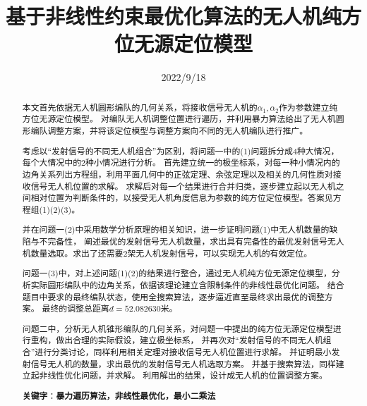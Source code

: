\documentclass{ctexart}
\title{基于非线性约束最优化算法的无人机纯方位无源定位模型}
\date{2022/9/18}
\def\al{\alpha}
\begin{document}
	\maketitle
	\renewcommand{\abstractname}{\Large 摘要\\}
	\begin{abstract}
		\normalsize
		本文首先依据无人机圆形编队的几何关系，将接收信号无人机的$\al_1,\al_2$作为参数建立纯方位无源定位模型。
		对编队无人机调整位置进行遍历，并利用暴力算法给出了无人机圆形编队调整方案，并将该定位模型与调整方案向不同的无人机编队进行推广。

		考虑以“发射信号的不同无人机组合”为区别，将问题一中的(1)问题拆分成4种大情况，每个大情况中的2种小情况进行分析。
		首先建立统一的极坐标系，对每一种小情况内的边角关系列出方程组，利用平面几何中的正弦定理、余弦定理以及相关的几何性质对接收信号无人机位置的求解。
		求解后对每一个结果进行合并归类，逐步建立起以无人机之间相对位置为判断条件的，以接受无人机角度信息为参数的纯方位定位模型。答案见方程组(1)(2)(3)。

		并在问题一(2)中采用数学分析原理的相关知识，进一步证明问题(1)中无人机数量的缺陷与不完备性，
		阐述最优的发射信号无人机数量，求出具有完备性的最优发射信号无人机数量选取。求出了还需要2架无人机发射信号，可以实现无人机的有效定位。

		问题一(3)中，对上述问题(1)(2)的结果进行整合，通过无人机纯方位无源定位模型，分析实际圆形编队中的边角关系，依据该理论建立含限制条件的非线性最优化问题。
		结合题目中要求的最终编队状态，使用全搜索算法，逐步逼近直至最终求出最优的调整方案。
		最终的调整总距离$d=52.082630$米。

		问题二中，分析无人机锥形编队的几何关系，对问题一中提出的纯方位无源定位模型进行重构，做出合理的实际假设，建立极坐标系，
		并再次对“发射信号的不同无人机组合”进行分类讨论，同样利用相关定理对接收信号无人机位置进行求解。
		并证明最小发射信号无人机的数量，求出最优的发射信号无人机选取方案。
		并基于搜索算法，同样建立起非线性优化问题，并求解。
		利用解出的结果，设计成无人机的位置调整方案。

		\textbf{关键字}：\bf{暴力遍历算法，非线性最优化，最小二乘法}
	\end{abstract}
	\newpage
	
\end{document}

